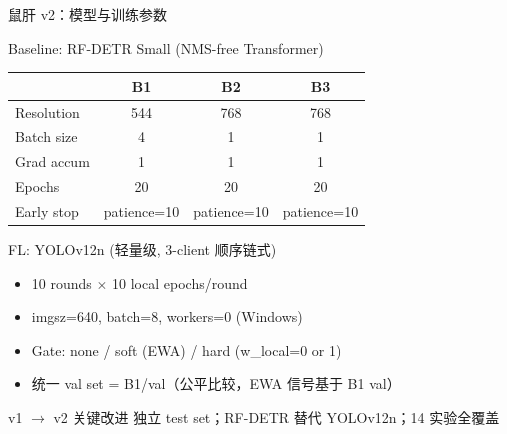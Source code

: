 \documentclass[aspectratio=169, 10pt]{beamer}
\begin{document}
\begin{frame}{鼠肝 v2：模型与训练参数}
  \begin{block}{Baseline: RF-DETR Small (NMS-free Transformer)}
    \begin{tabular}{lccc}
      \toprule
      & \textbf{B1} & \textbf{B2} & \textbf{B3} \\
      \midrule
      Resolution & 544 & 768 & 768 \\
      Batch size & 4 & 1 & 1 \\
      Grad accum & 1 & 1 & 1 \\
      Epochs & 20 & 20 & 20 \\
      Early stop & patience=10 & patience=10 & patience=10 \\
      \bottomrule
    \end{tabular}
  \end{block}
  \vspace{0em}
  \begin{block}{FL: YOLOv12n (轻量级, 3-client 顺序链式)}
    \begin{itemize}
      \item 10 rounds $\times$ 10 local epochs/round
      \item imgsz=640, batch=8, workers=0 (Windows)
      \item Gate: none / soft (EWA) / hard (w\_local=0 or 1)
      \item 统一 val set = B1/val（公平比较，EWA 信号基于 B1 val）
    \end{itemize}
  \end{block}
  \vspace{0em}
  \begin{alertblock}{v1 $\to$ v2 关键改进}
    独立 test set；RF-DETR 替代 YOLOv12n；14 实验全覆盖
  \end{alertblock}
\end{frame}
\end{document}
